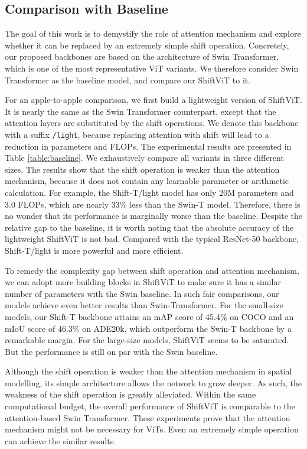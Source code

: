 \documentclass[letterpaper]{article} \usepackage{aaai22}  \usepackage{times}  \usepackage{helvet}  \usepackage{courier}  \usepackage[hyphens]{url}  \usepackage{graphicx} \usepackage{amsmath}
\begin{document}
\subsection{Comparison with Baseline}

The goal of this work is to demystify the role of attention mechanism and explore whether it can be replaced by an extremely simple shift operation. Concretely, our proposed backbones are based on the architecture of Swin Transformer, which is one of the most representative ViT variants. We therefore consider Swin Transformer as the baseline model, and compare our ShiftViT to it.

For an apple-to-apple comparison, we first build a lightweight version of ShiftViT. It is nearly the same as the Swin Transformer counterpart, except that the attention layers are substituted by the shift operations. We denote this backbone with a suffix \texttt{/light}, because replacing attention with shift will lead to a reduction in parameters and FLOPs. The experimental results are presented in Table \ref{table:baseline}. We exhaustively compare all variants in three different sizes. The results show that the shift operation is weaker than the attention mechanism, because it does not contain any learnable parameter or arithmetic calculation. For example, the Shift-T/light model has only 20M parameters and 3.0 FLOPs, which are nearly 33\% less than the Swin-T model. Therefore, there is no wonder that its performance is marginally worse than the baseline. Despite the relative gap to the baseline, it is worth noting that the absolute accuracy of the lightweight ShiftViT is not bad. Compared with the typical ResNet-50 backbone, Shift-T/light is more powerful and more efficient.

To remedy the complexity gap between shift operation and attention mechanism, we can adopt more building blocks in ShiftViT to make sure it has a similar number of parameters with the Swin baseline. In such fair comparisons, our models achieve even better results than Swin-Transformer. For the small-size models, our Shift-T backbone attains an mAP score of 45.4\% on COCO and an mIoU score of 46.3\% on ADE20k, which outperform the Swin-T backbone by a remarkable margin. For the large-size models, ShiftViT seems to be saturated. But the performance is still on par with the Swin baseline.

Although the shift operation is weaker than the attention mechanism in spatial modelling, its simple architecture allows the network to grow deeper. As such, the weakness of the shift operation is greatly alleviated. Within the same computational budget, the overall performance of ShiftViT is comparable to the attention-based Swin Transformer. These experiments prove that the attention mechanism might not be necessary for ViTs. Even an extremely simple operation can achieve the similar results.
\end{document}
